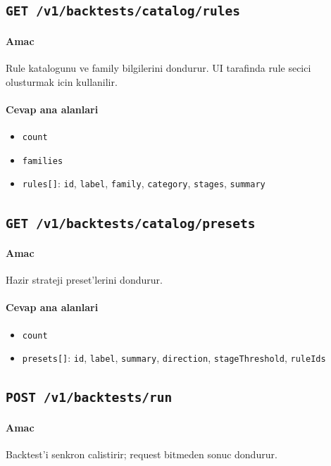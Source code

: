 \documentclass[11pt,a4paper]{article}
\begin{document}
\subsection{\texttt{GET /v1/backtests/catalog/rules}}

\paragraph{Amac}
Rule katalogunu ve family bilgilerini dondurur. UI tarafinda rule secici olusturmak icin kullanilir.

\paragraph{Cevap ana alanlari}
\begin{itemize}[leftmargin=1.5em]
    \item \texttt{count}
    \item \texttt{families}
    \item \texttt{rules[]}: \texttt{id}, \texttt{label}, \texttt{family}, \texttt{category}, \texttt{stages}, \texttt{summary}
\end{itemize}

\subsection{\texttt{GET /v1/backtests/catalog/presets}}

\paragraph{Amac}
Hazir strateji preset'lerini dondurur.

\paragraph{Cevap ana alanlari}
\begin{itemize}[leftmargin=1.5em]
    \item \texttt{count}
    \item \texttt{presets[]}: \texttt{id}, \texttt{label}, \texttt{summary}, \texttt{direction}, \texttt{stageThreshold}, \texttt{ruleIds}
\end{itemize}

\subsection{\texttt{POST /v1/backtests/run}}

\paragraph{Amac}
Backtest'i senkron calistirir; request bitmeden sonuc dondurur.
\end{document}
